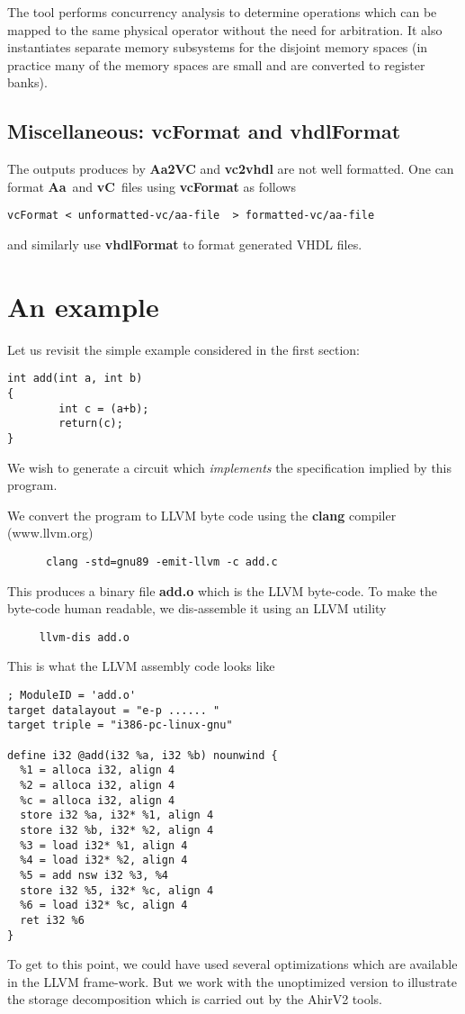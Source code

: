 \documentclass{article}
\newcommand{\Aa}{{\bf Aa}~}
\newcommand{\vC}{{\bf vC}~}
\begin{document}
The tool performs concurrency analysis to determine operations which
can be mapped to the same physical operator without the need for
arbitration.  It also instantiates separate memory subsystems for
the disjoint memory spaces (in practice many of the memory spaces
are small and are converted to register banks).

\subsection{Miscellaneous: {\bf vcFormat} and {\bf vhdlFormat}}

The outputs produces by {\bf Aa2VC} and {\bf vc2vhdl} are
not well formatted.  One can format \Aa and \vC files
using  {\bf vcFormat} as follows
\begin{verbatim}
vcFormat < unformatted-vc/aa-file  > formatted-vc/aa-file
\end{verbatim}
and similarly use {\bf vhdlFormat} to format generated
VHDL files.


\section{An example} \label{sec:Example}

Let us revisit the simple example considered in
the first section:
\begin{verbatim}
int add(int a, int b)
{
        int c = (a+b);
        return(c);
}
\end{verbatim}
We wish to generate a circuit which {\em implements}
the specification implied by this program.

We convert the program to LLVM byte code using
the {\bf clang} compiler (www.llvm.org)
\begin{verbatim}
      clang -std=gnu89 -emit-llvm -c add.c
\end{verbatim}
This produces a binary file {\bf add.o} which is
the LLVM byte-code.  To make the byte-code human
readable, we dis-assemble it using an LLVM utility
\begin{verbatim}
     llvm-dis add.o
\end{verbatim}
This is what the LLVM assembly code looks like
\begin{verbatim}
; ModuleID = 'add.o'
target datalayout = "e-p ...... "
target triple = "i386-pc-linux-gnu"

define i32 @add(i32 %a, i32 %b) nounwind {
  %1 = alloca i32, align 4
  %2 = alloca i32, align 4
  %c = alloca i32, align 4
  store i32 %a, i32* %1, align 4
  store i32 %b, i32* %2, align 4
  %3 = load i32* %1, align 4
  %4 = load i32* %2, align 4
  %5 = add nsw i32 %3, %4
  store i32 %5, i32* %c, align 4
  %6 = load i32* %c, align 4
  ret i32 %6
}
\end{verbatim}
To get to this point, we could have used several
optimizations which are available in the LLVM frame-work.
But we work with the unoptimized version to illustrate
the storage decomposition which is carried out by
the AhirV2 tools.
\end{document}
